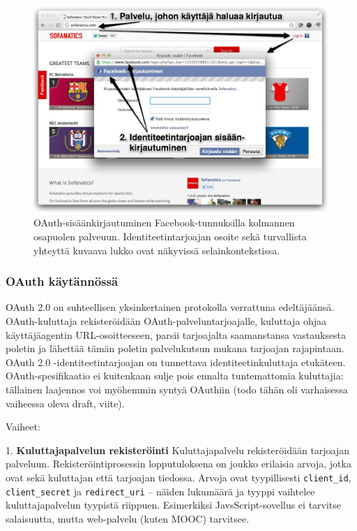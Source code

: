 \documentclass[finnish,gradu]{tktltiki}
\begin{document}
  \begin{figure}
    \centering
    \includegraphics[width=1.0\textwidth]{images/facebook_popup_login.jpg}
    \caption{OAuth-sisäänkirjautuminen Facebook-tunnuksilla kolmannen osapuolen palveuun. Identiteetintarjoajan osoite sekä turvallista yhteyttä kuvaava lukko ovat näkyvissä selainkontekstissa.}
    \label{fig:facebook_oauth_login}
  \end{figure}


  \subsubsection{OAuth käytännössä} %
  \label{ssub:oauth_käytännössä}

  OAuth 2.0 on suhteellisen yksinkertainen protokolla verrattuna edeltäjäänsä. OAuth-kuluttaja rekisteröidään OAuth-palveluntarjoajalle, kuluttaja ohjaa käyttäjäagentin URL-osoitteeseen, parsii tarjoajalta saamanstansa vastauksesta poletin ja lähettää tämän poletin palvelukutsun mukana tarjoajan rajapintaan. OAuth 2.0 -identiteetintarjoajan on tunnettava identiteetinkuluttaja etukäteen. OAuth-spesifikaatio ei kuitenkaan sulje pois ennalta tuntemattomia kuluttajia: tällainen laajennos voi myöhemmin syntyä OAuthiin (todo tähän oli varhaisessa vaiheessa oleva draft, viite).

  Vaiheet:

  1. \textbf{Kuluttajapalvelun rekisteröinti} Kuluttajapalvelu rekisteröidään tarjoajan palveluun. Rekisteröintiprosessin lopputuloksena on joukko erilaisia arvoja, jotka ovat sekä kuluttajan että tarjoajan tiedossa. Arvoja ovat tyypillisesti \verb!client_id!, \verb!client_secret! ja \verb!redirect_uri! -- näiden lukumäärä ja tyyppi vaihtelee kuluttajapalvelun tyypistä riippuen. Esimerkiksi JavsScript-sovellus ei tarvitse salaisuutta, mutta web-palvelu (kuten MOOC) tarvitsee.
\end{document}
